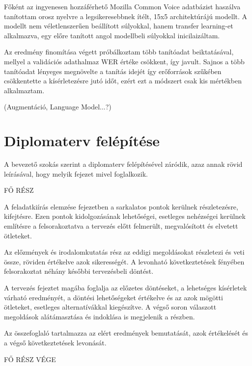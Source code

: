 Főként az ingyenesen hozzáférhető Mozilla Common Voice adatbázist haszálva tanítottam orosz nyelvre a legsikeresebbnek ítélt, 15x5 architektúrájú modellt. A modellt nem véletlenszerűen beállított súlyokkal, hanem transfer learning-et alkalmazva, egy előre tanított angol modellbeli súlyokkal inicilaizáltam.

Az eredmény finomítása végett próbálkoztam több tanítóadat beiktatásával, mellyel a validációs adathalmaz WER értéke csökkent, így javult. Sajnos a több tanítóadat lényeges megnövelte a tanítás idejét így erőforrások szűkében csökkentette a kísérletezésre jutó időt, ezért ezt a módszert csak kis mértékben alkalmaztam.

(Augmentáció, Language Model...?)

\section{Diplomaterv felépítése}

A bevezető szokás szerint a diplomaterv felépítésével záródik, azaz annak rövid leírásával, hogy melyik fejezet mivel foglalkozik.

FŐ RÉSZ

A feladatkiírás elemzése fejezetben a sarkalatos pontok kerülnek részletezésre, kifejtésre. Ezen pontok kidolgozásának lehetőségei, esetleges nehézségei kerülnek említésre a felsorakoztatva a tervezés előtt felmerült, megvalósított és elvetett ötleteket.

Az előzmények és irodalomkutatás rész az eddigi megoldásokat részletezi és veti össze, röviden értékelve azok sikerességét. A levonható következtetések fényében felsorakoztat néhány későbbi tervezésbeli döntést.

A tervezés fejeztet magába foglalja az előzetes döntéseket, a lehetséges kísérletek várható eredményét, a döntési lehetőségeket értékelve és az azok mögötti ötleteket, esetleges alternatívákkal kiegészítve. A végső soron válaszott megoldások alátámasztása és indoklása is megjelenik a részben.

Az összefoglaló tartalmazza az elért eredmények bemutatását, azok értékelését és a végső következtetések levonását.

FŐ RÉSZ VÉGE